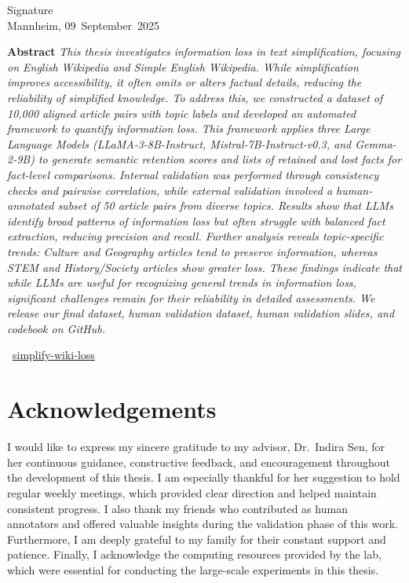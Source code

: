 \documentclass{DESSThesis}
\begin{document}
\vspace{2cm}
\noindent Signature \hfill \makebox[6cm]{\hrulefill}\\[-0.2em]
\noindent Mannheim, 09~September~2025 \hfill {}
\clearpage

\noindent\textbf{Abstract} 
\textit{%
This thesis investigates information loss in text simplification, focusing on English Wikipedia and Simple English Wikipedia. While simplification improves accessibility, it often omits or alters factual details, reducing the reliability of simplified knowledge. To address this, we constructed a dataset of 10,000 aligned article pairs with topic labels and developed an automated framework to quantify information loss. This framework applies three Large Language Models (LLaMA-3-8B-Instruct, Mistral-7B-Instruct-v0.3, and Gemma-2-9B) to generate semantic retention scores and lists of retained and lost facts for fact-level comparisons. Internal validation was performed through consistency checks and pairwise correlation, while external validation involved a human-annotated subset of 50 article pairs from diverse topics. Results show that LLMs identify broad patterns of information loss but often struggle with balanced fact extraction, reducing precision and recall. Further analysis reveals topic-specific trends: Culture and Geography articles tend to preserve information, whereas STEM and History/Society articles show greater loss. These findings indicate that while LLMs are useful for recognizing general trends in information loss, significant challenges remain for their reliability in detailed assessments. We release our final dataset, human validation dataset, human validation slides, and codebook on GitHub.  }

\noindent\faGithub\ \href{https://github.com/seoyoung-yoo/simplify-wiki-loss.git}{simplify-wiki-loss}

\clearpage

\chapter*{Acknowledgements}
I would like to express my sincere gratitude to my advisor, Dr.\ Indira Sen, for her continuous guidance, constructive feedback, and encouragement throughout the development of this thesis. I am especially thankful for her suggestion to hold regular weekly meetings, which provided clear direction and helped maintain consistent progress. I also thank my friends who contributed as human annotators and offered valuable insights during the validation phase of this work. Furthermore, I am deeply grateful to my family for their constant support and patience. Finally, I acknowledge the computing resources provided by the lab, which were essential for conducting the large-scale experiments in this thesis.
\clearpage
\end{document}
